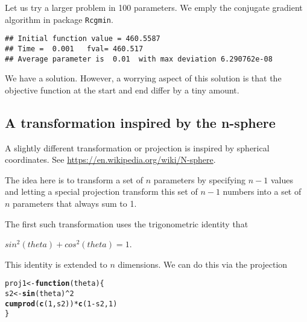 \documentclass[11pt]{article}\usepackage[]{graphicx}\usepackage[]{color}
\makeatletter
\newcommand{\hlnum}[1]{\textcolor[rgb]{0.686,0.059,0.569}{#1}}%
\newcommand{\hlopt}[1]{\textcolor[rgb]{0,0,0}{#1}}%
\newcommand{\hlstd}[1]{\textcolor[rgb]{0.345,0.345,0.345}{#1}}%
\newcommand{\hlkwa}[1]{\textcolor[rgb]{0.161,0.373,0.58}{\textbf{#1}}}%
\newcommand{\hlkwb}[1]{\textcolor[rgb]{0.69,0.353,0.396}{#1}}%
\newcommand{\hlkwc}[1]{\textcolor[rgb]{0.333,0.667,0.333}{#1}}%
\newcommand{\hlkwd}[1]{\textcolor[rgb]{0.737,0.353,0.396}{\textbf{#1}}}%
\newenvironment{kframe}{%
 \def\at@end@of@kframe{}%
 \ifinner\ifhmode%
  \def\at@end@of@kframe{\end{minipage}}%
  \begin{minipage}{\columnwidth}%
 \fi\fi%
 \def\FrameCommand##1{\hskip\@totalleftmargin \hskip-\fboxsep
 \colorbox{shadecolor}{##1}\hskip-\fboxsep
     \hskip-\linewidth \hskip-\@totalleftmargin \hskip\columnwidth}%
 \MakeFramed {\advance\hsize-\width
   \@totalleftmargin\z@ \linewidth\hsize
   \@setminipage}}%
 {\par\unskip\endMakeFramed%
 \at@end@of@kframe}
\newenvironment{knitrout}{}{} %
\newcommand{\code}[1]{{\tt#1}}
\makeatother
\begin{document}
Let us try a larger problem in 100 parameters. We emply the conjugate gradient
algorithm in package \code{Rcgmin}.

\begin{knitrout}\scriptsize
{}\color{fgcolor}\begin{kframe}
\begin{verbatim}
## Initial function value = 460.5587
## Time =  0.001   fval= 460.517
## Average parameter is  0.01  with max deviation 6.290762e-08
\end{verbatim}
\end{kframe}
\end{knitrout}

We have a solution. However, a worrying aspect of this 
solution is that the objective function 
at the start and end differ by a tiny amount. 

\subsection{A transformation inspired by the n-sphere}

A slightly different transformation or projection is inspired by spherical coordinates.
See \url{https://en.wikipedia.org/wiki/N-sphere}.

The idea here is to transform a set of $n$ parameters by specifying $n-1$ values and
letting a special projection transform this set of $n-1$ numbers into a set of $n$ parameters
that always sum to 1. 

The first such transformation uses the trigonometric identity that 

$sin^2(theta) + cos^2(theta) =1$.

This identity is extended to $n$ dimensions. We can do this via the projection

\begin{knitrout}\scriptsize
{}\color{fgcolor}\begin{kframe}
\begin{alltt}
\hlstd{proj1} \hlkwb{<-} \hlkwa{function}\hlstd{(}\hlkwc{theta}\hlstd{) \{}
   \hlstd{s2} \hlkwb{<-} \hlkwd{sin}\hlstd{(theta)}\hlopt{^}\hlnum{2}
    \hlkwd{cumprod}\hlstd{(}\hlkwd{c}\hlstd{(}\hlnum{1}\hlstd{, s2))} \hlopt{*} \hlkwd{c}\hlstd{(}\hlnum{1}\hlopt{-}\hlstd{s2,} \hlnum{1}\hlstd{)}
\hlstd{\}}
\end{alltt}
\end{kframe}
\end{knitrout}
\end{document}
